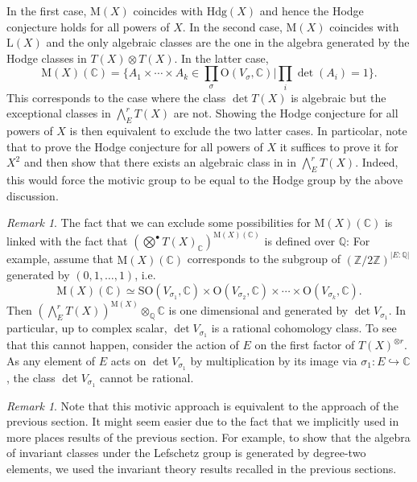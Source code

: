 \documentclass[11pt,twoside,a4paper]{amsart}
\newcommand{\0}{\mathscr{O}}
\newcommand{\Q}{\mathbb{Q}}
\newcommand{\C}{\mathbb{C}}
\newcommand{\s}{\sigma}
\theoremstyle{plain}
\theoremstyle{definition}
\theoremstyle{remark}
\newtheorem{rmk}[thm]{Remark}
\begin{document}
In the first case, $\mathrm{M}(X)$ coincides with $\mathrm{Hdg}(X)$ and hence the Hodge conjecture holds for all powers of $X$. In the second case, $\mathrm{M}(X)$ coincides with $\mathrm{L}(X)$ and the only algebraic classes are the one in the algebra generated by the Hodge classes in $T(X)\otimes T(X)$. In the latter case, 
\[
\textstyle\mathrm{M}(X)(\C)=\{A_1\times\cdots \times A_k\in \prod_\s \mathrm{O}(V_\s,\C)|\prod_i\det(A_i)=1\}.
\]
This corresponds to the case where the class $\det T(X)$ is algebraic but the exceptional classes in $\bigwedge^r_E T(X)$ are not.
Showing the Hodge conjecture for all powers of $X$ is then equivalent to exclude the two latter cases. In particolar, note that to prove the Hodge conjecture for all powers of $X$ it suffices to prove it for $X^2$ and then show that there exists an algebraic class in in $\bigwedge^r_E T(X)$. Indeed, this would force the motivic group to be equal to the Hodge group by the above discussion.
\begin{rmk}
The fact that we can exclude some possibilities for $\mathrm{M}(X)(\C)$ 
is linked with the fact that $\left(\bigotimes^\bullet T(X)_\C\right)^{\mathrm{M}(X)(\C)}$ is defined over $\Q$: For example, assume that $\mathrm{M}(X)(\C)$ corresponds to the subgroup of $(\mathbb{Z}/2\mathbb{Z})^{|E:\Q|}$ generated by $(0,1,\ldots,1)$, i.e. \[\mathrm{M}(X)(\C)\simeq \mathrm{SO}(V_{\sigma_1},\C)\times \mathrm{O}(V_{\sigma_2},\C)\times \cdots \times \mathrm{O}(V_{\sigma_k},\C).\] 
Then $\left(\bigwedge^r_E T(X)\right)^{\mathrm{M}(X)}\otimes_\Q\C$ is one dimensional and generated by $\det V_{\s_1}$. In particular, up to complex scalar, $\det V_{\s_1}$ is a rational cohomology class. To see that this cannot happen, consider the action of $E$ on the first factor of $T(X)^{\otimes r}$. As any element of $E$ acts on $\det V_{\s_1}$ by multiplication by its image via $\sigma_1\colon E\hookrightarrow \C$, the class $\det V_{\s_1}$ cannot be rational.
\end{rmk}
\begin{rmk}
Note that this motivic approach is equivalent to the approach of the previous section. It might seem easier due to the fact that we implicitly used in more places results of the previous section. For example, to show that the algebra of invariant classes under the Lefschetz group is generated by degree-two elements, we used the invariant theory results recalled in the previous sections.
\end{rmk}
\end{document}

